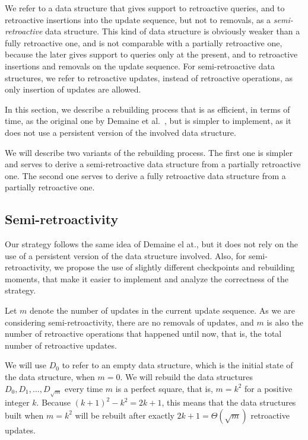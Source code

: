 \documentclass[3p,times,procedia]{elsarticle}
\begin{document}
We refer to a data structure that gives support to retroactive queries, 
and to retroactive insertions into the update sequence, but not to removals, 
as a \emph{semi-retroactive} data structure.
This kind of data structure is obviously weaker than a fully retroactive one, and
is not comparable with a partially retroactive one, because the later gives support 
to queries only at the present, and to retroactive insertions and removals on the 
update sequence.  For semi-retroactive data structures, we refer to retroactive 
updates, instead of retroactive operations, as only insertion of updates are allowed. 

In this section, we describe a rebuilding process that is as efficient, in terms 
of time, as the original one by Demaine et al.~\cite{DemaineIL2007}, but is simpler 
to implement, as it does not use a persistent version of the involved data structure. 

We will describe two variants of the rebuilding process. The first one is simpler
and serves to derive a semi-retroactive data structure from a partially retroactive 
one.  The second one serves to derive a fully retroactive data structure from a 
partially retroactive one. 

\subsection{Semi-retroactivity}\label{subsec:semi}

Our strategy follows the same idea of Demaine el at., but it does not 
rely on the use of a persistent version of the data structure involved. 
Also, for semi-retroactivity, we propose the use of slightly different 
checkpoints and rebuilding moments, that make it easier to implement 
and analyze the correctness of the strategy. 

Let $m$ denote the number of updates in the current update sequence. 
As we are considering semi-retroactivity, there are no removals of updates, 
and $m$ is also the number of retroactive operations that happened until now, 
that is, the total number of retroactive updates. 

We will use $D_0$ to refer to an empty data structure, 
which is the initial state of the data structure, when $m=0$. 
We will rebuild the data structures $D_0,D_1,\ldots,D_{\sqrt{m}}$ every 
time $m$ is a perfect square, that is, $m=k^2$ for a positive integer $k$.
Because $(k+1)^2-k^2 = 2k+1$, this means that the data structures built 
when $m=k^2$ will be rebuilt after exactly $2k+1=\Theta(\sqrt{m})$ retroactive updates.
\end{document}
